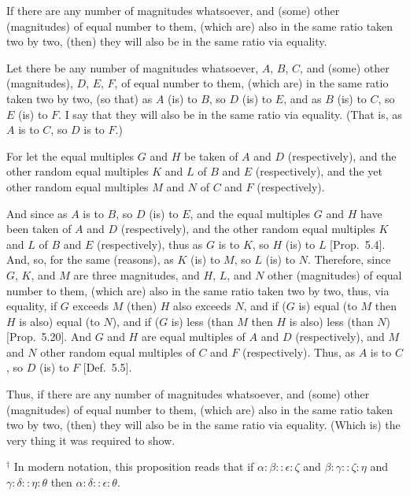 \begin{Parallel}{}{}
{If there are any number of magnitudes
whatsoever, and (some) other (magnitudes)  of equal  number to them, (which are)
also in the same ratio taken two by two, (then) they will also be in the
same ratio via equality.

\epsfysize=0.58in
\centerline{}

Let there be any number of magnitudes whatsoever, $A$, $B$,  $C$, and
(some) other (magnitudes), $D$, $E$, $F$, of equal number to them, (which are)
in the same ratio taken two by two, (so that) as $A$ (is) to $B$, so
$D$ (is) to $E$, and as $B$ (is) to $C$, so $E$ (is) to $F$. I say that they
will also be in the same ratio via equality. (That is, as $A$ is to $C$, so
$D$ is to $F$.)

For let the equal multiples $G$ and $H$ be taken of $A$ and $D$ (respectively), and the other random equal multiples $K$ and $L$ of $B$ and
$E$ (respectively), and the yet other random equal multiples $M$ and $N$ of
$C$ and $F$ (respectively).

And since as $A$ is to $B$, so $D$ (is) to $E$, and the equal multiples $G$ and $H$
have been taken of $A$ and $D$ (respectively), and the other random
equal multiples $K$ and $L$ of $B$ and $E$ (respectively), thus as $G$ is to $K$,
so $H$ (is) to $L$ [Prop.~5.4]. And, so, for the same
(reasons), as $K$ (is) to $M$, so $L$ (is) to $N$. Therefore, since $G$, $K$, and $M$ are three magnitudes, and $H$, $L$, and $N$ other (magnitudes) of equal number to them,
(which are) also in the same ratio taken two by two, thus, via equality,
if $G$ exceeds $M$ (then) $H$ also exceeds $N$, and if ($G$ is) equal (to $M$ then $H$
is also) equal (to $N$), and if ($G$ is) less (than $M$ then $H$
is also) less (than $N$) [Prop.~5.20].
And  $G$ and $H$ are equal multiples of $A$ and $D$ (respectively),
and $M$ and $N$ other random equal multiples of $C$ and $F$ (respectively).
Thus, as $A$ is to $C$, so $D$ (is) to $F$ [Def.~5.5].

Thus, if there are any number of magnitudes
whatsoever, and (some) other (magnitudes) of equal number to them, (which are)
also in the same ratio taken two by two, (then) they will also be in the
same ratio via equality. (Which is) the very thing
it was required to show.}
\end{Parallel}
{\footnotesize \noindent $^\dag$ In modern notation, this proposition
reads that if $\alpha:\beta::\epsilon:\zeta$ and $\beta:\gamma::\zeta:\eta$ 
and $\gamma:\delta::\eta:\theta$ 
then $\alpha:\delta::\epsilon:\theta$.}

